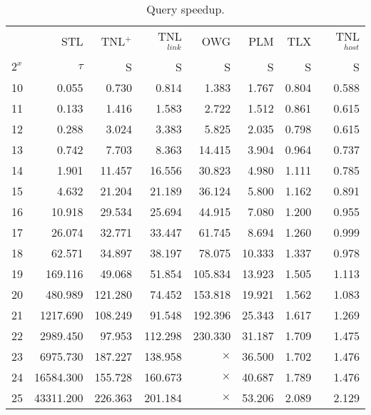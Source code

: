 \begin{table}
  \centering

  \begin{tabular}{lr|rrrrrr}
    \toprule
    {}    & STL       & TNL$^+$ & TNL$^{link}$ & OWG      & PLM    & TLX   & TNL$^{host}$ \\
    $2^x$ & $\tau$    & S       & S            & S        & S      & S     & S            \\
    \midrule
    10    & 0.055     & 0.730   & 0.814        & 1.383    & 1.767  & 0.804 & 0.588        \\
    11    & 0.133     & 1.416   & 1.583        & 2.722    & 1.512  & 0.861 & 0.615        \\
    12    & 0.288     & 3.024   & 3.383        & 5.825    & 2.035  & 0.798 & 0.615        \\
    13    & 0.742     & 7.703   & 8.363        & 14.415   & 3.904  & 0.964 & 0.737        \\
    14    & 1.901     & 11.457  & 16.556       & 30.823   & 4.980  & 1.111 & 0.785        \\
    15    & 4.632     & 21.204  & 21.189       & 36.124   & 5.800  & 1.162 & 0.891        \\
    16    & 10.918    & 29.534  & 25.694       & 44.915   & 7.080  & 1.200 & 0.955        \\
    17    & 26.074    & 32.771  & 33.447       & 61.745   & 8.694  & 1.260 & 0.999        \\
    18    & 62.571    & 34.897  & 38.197       & 78.075   & 10.333 & 1.337 & 0.978        \\
    19    & 169.116   & 49.068  & 51.854       & 105.834  & 13.923 & 1.505 & 1.113        \\
    20    & 480.989   & 121.280 & 74.452       & 153.818  & 19.921 & 1.562 & 1.083        \\
    21    & 1217.690  & 108.249 & 91.548       & 192.396  & 25.343 & 1.617 & 1.269        \\
    22    & 2989.450  & 97.953  & 112.298      & 230.330  & 31.187 & 1.709 & 1.475        \\
    23    & 6975.730  & 187.227 & 138.958      & $\times$ & 36.500 & 1.702 & 1.476        \\
    24    & 16584.300 & 155.728 & 160.673      & $\times$ & 40.687 & 1.789 & 1.476        \\
    25    & 43311.200 & 226.363 & 201.184      & $\times$ & 53.206 & 2.089 & 2.129        \\
    \bottomrule
  \end{tabular}
  \caption{Query speedup.}
  \label{table:query-speedup}
\end{table}